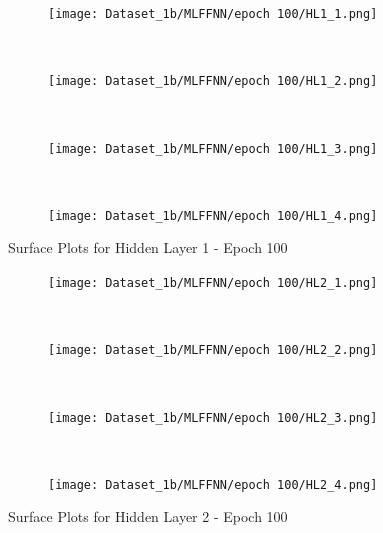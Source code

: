 \begin{figure}[!ht]
    \centering
    \begin{subfigure}[h]{0.5\textwidth}
        \centering
        \texttt{[image: Dataset\_1b/MLFFNN/epoch 100/HL1\_1.png]}
    \end{subfigure}%
    ~ 
    \begin{subfigure}[h]{0.5\textwidth}
        \centering
        \texttt{[image: Dataset\_1b/MLFFNN/epoch 100/HL1\_2.png]}
    \end{subfigure}%
    ~
    
    \begin{subfigure}[h]{0.4\textwidth}
        \centering
        \texttt{[image: Dataset\_1b/MLFFNN/epoch 100/HL1\_3.png]}
    \end{subfigure}
    ~
    \begin{subfigure}[h]{0.4\textwidth}
        \centering
        \texttt{[image: Dataset\_1b/MLFFNN/epoch 100/HL1\_4.png]}
    \end{subfigure}
    \caption{Surface Plots for Hidden Layer 1 - Epoch 100}
    \label{fig:13}
\end{figure}


\begin{figure}[!ht]
    \centering
    \begin{subfigure}[h]{0.5\textwidth}
        \centering
        \texttt{[image: Dataset\_1b/MLFFNN/epoch 100/HL2\_1.png]}
    \end{subfigure}%
    ~ 
    \begin{subfigure}[h]{0.5\textwidth}
        \centering
        \texttt{[image: Dataset\_1b/MLFFNN/epoch 100/HL2\_2.png]}
    \end{subfigure}%
    ~
    
    \begin{subfigure}[h]{0.4\textwidth}
        \centering
        \texttt{[image: Dataset\_1b/MLFFNN/epoch 100/HL2\_3.png]}
    \end{subfigure}
    ~
    \begin{subfigure}[h]{0.4\textwidth}
        \centering
        \texttt{[image: Dataset\_1b/MLFFNN/epoch 100/HL2\_4.png]}
    \end{subfigure}
    \caption{Surface Plots for Hidden Layer 2 - Epoch 100}
    \label{fig:13}
\end{figure}

\newpage


